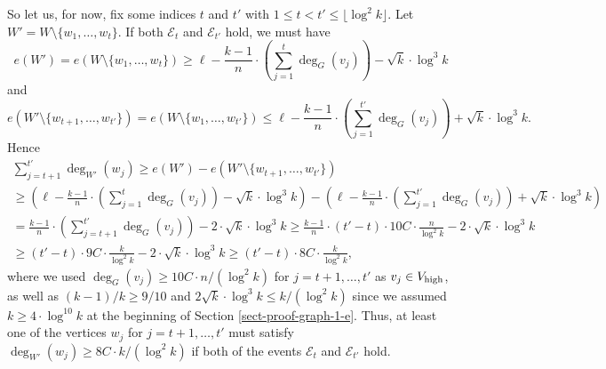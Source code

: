 So let us, for now, fix some indices $t$ and $t'$ with $1\leq t<t'\leq \lfloor\log^2 k\rfloor$. Let $W'=W\setminus \lbrace w_1,\dots,w_t\rbrace$. If both $\mathscr{E}_t$ and $\mathscr{E}_{t'}$ hold, we must have
\[e(W')=e(W\setminus \lbrace w_{1},\dots,w_t\rbrace)\geq \ell-\frac{k-1}{n}\cdot\left(\sum_{j=1}^{t}\deg_G(v_j)\right)-\sqrt{k}\cdot \log^3 k\]
and
\[e(W'\setminus \lbrace w_{t+1},\dots,w_{t'}\rbrace)=e(W\setminus \lbrace w_{1},\dots,w_{t'}\rbrace)\leq \ell-\frac{k-1}{n}\cdot\left(\sum_{j=1}^{t'}\deg_G(v_j)\right)+\sqrt{k}\cdot \log^3 k.\]
Hence
\begin{multline*}
\sum_{j=t+1}^{t'}\deg_{W'}(w_j)\geq e(W')-e(W'\setminus \lbrace w_{t+1},\dots,w_{t'}\rbrace)\\
\geq \left(\ell-\frac{k-1}{n}\cdot\left(\sum_{j=1}^{t}\deg_G(v_j)\right)-\sqrt{k}\cdot \log^3 k\right)-\left(\ell-\frac{k-1}{n}\cdot\left(\sum_{j=1}^{t'}\deg_G(v_j)\right)+\sqrt{k}\cdot \log^3 k\right)\\
=\frac{k-1}{n}\cdot\left(\sum_{j=t+1}^{t'}\deg_G(v_j)\right)-2\cdot \sqrt{k}\cdot \log^3 k\geq 
\frac{k-1}{n}\cdot(t'-t)\cdot 10C\cdot \frac{n}{\log^2 k}-2\cdot \sqrt{k}\cdot \log^3 k\\
\geq (t'-t)\cdot 9C\cdot \frac{k}{\log^2 k}-2\cdot \sqrt{k}\cdot \log^3 k
\geq (t'-t)\cdot 8C\cdot \frac{k}{\log^2 k},
\end{multline*}
where we used $\deg_G(v_j)\geq 10C\cdot n/(\log^2 k)$ for $j=t+1,\dots,t'$ as $v_j\in V_{\textnormal{high}}$, as well as $(k-1)/k\geq 9/10$ and $2\sqrt{k}\cdot \log^3 k\leq k/(\log^2 k)$ since we assumed $k\geq 4\cdot \log^{10} k$ at the beginning of Section \ref{sect-proof-graph-1-e}. Thus, at least one of the vertices $w_j$ for $j=t+1,\dots,t'$ must satisfy $\deg_{W'}(w_j)\geq 8C\cdot k/(\log^2 k)$ if both of the events $\mathscr{E}_t$ and $\mathscr{E}_{t'}$ hold.

